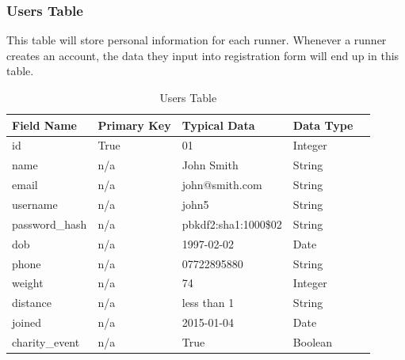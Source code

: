 \documentclass{article}[12pt,a4paper]
\begin{document}
\subsubsection{Users Table}
This table will store personal information for each runner. Whenever a runner creates an account, the data they input into registration form will end up in this table.

\begin{table}[htbp]
\begin{tabular}{|l|l|l|l|l|}
\hline
\textbf{Field Name}     & \textbf{Primary Key} & \textbf{Typical Data} & \textbf{Data Type} \\ \hline
id             & True        & 01                   & Integer   \\ \hline
name           & n/a         & John Smith           & String    \\ \hline
email          & n/a         & john@smith.com       & String    \\ \hline
username       & n/a         & john5                & String    \\ \hline
password\_hash & n/a         & pbkdf2:sha1:1000\$02 & String    \\ \hline
dob            & n/a         & 1997-02-02           & Date      \\ \hline
phone          & n/a         & 07722895880          & String    \\ \hline
weight         & n/a         & 74                   & Integer   \\ \hline
distance       & n/a         & less than 1          & String    \\ \hline
joined         & n/a         & 2015-01-04           & Date      \\ \hline
charity\_event & n/a         & True                 & Boolean   \\ \hline
\end{tabular}
\caption{Users Table}
\end{table}
\end{document}
